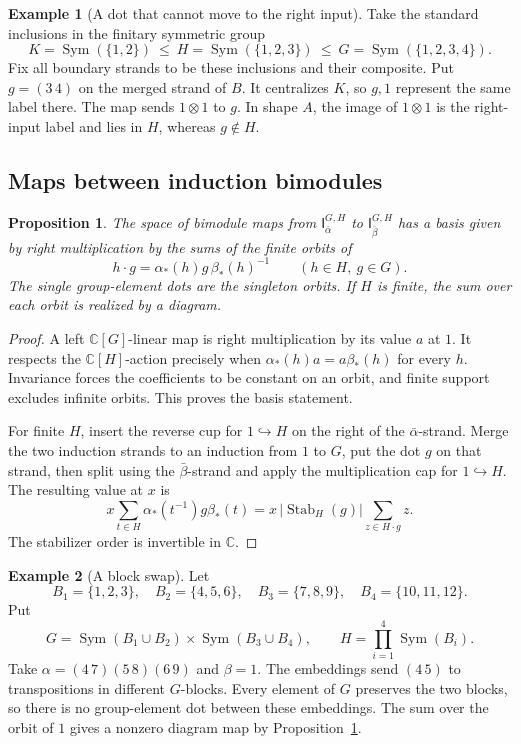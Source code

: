 \documentclass[11pt,a4paper]{article}
\numberwithin{equation}{section}
\newtheorem{proposition}[theorem]{Proposition}
\theoremstyle{definition}
\newtheorem{example}{Example}[section]
\newcommand{\C}{\mathbb C}
\newcommand{\I}{\mathsf I}
\begin{document}
\begin{example}[A dot that cannot move to the right input]\label{ex:dot-slide-obstruction}
Take the standard inclusions in the finitary symmetric group
\[
   K=\operatorname{Sym}(\{1,2\})\ \le\
   H=\operatorname{Sym}(\{1,2,3\})\ \le\
   G=\operatorname{Sym}(\{1,2,3,4\}).
\]
Fix all boundary strands to be these inclusions and their composite.
Put \(g=(3\,4)\) on the merged strand of \(B\). It centralizes
\(K\), so \(g,1\) represent the same label there. The map sends
\(1\otimes1\) to \(g\). In shape \(A\), the image of \(1\otimes1\)
is the right-input label and lies in \(H\), whereas \(g\notin H\).
\end{example}


\subsection{Maps between induction bimodules}

\begin{proposition}\label{prop:orbit-hom}
The space of bimodule maps from \(\I_{\bar\alpha}^{G,H}\) to
\(\I_{\bar\beta}^{G,H}\) has a basis given by right multiplication
by the sums of the finite orbits of
\[
       h\cdot g=\alpha_*(h)g\,\beta_*(h)^{-1}
       \qquad(h\in H,\ g\in G).
\]
The single group-element dots are the singleton orbits. If \(H\) is
finite, the sum over each orbit is realized by a diagram.
\end{proposition}
\begin{proof}
A left \(\C[G]\)-linear map is right multiplication by its value \(a\)
at \(1\). It respects the \(\C[H]\)-action precisely when
\(\alpha_*(h)a=a\beta_*(h)\) for every \(h\). Invariance forces the
coefficients to be constant on an orbit, and finite support excludes
infinite orbits. This proves the basis statement.

For finite \(H\), insert the reverse cup for \(1\hookrightarrow H\)
on the right of the \(\bar\alpha\)-strand. Merge the two induction
strands to an induction from \(1\) to \(G\), put the dot \(g\) on
that strand, then split using the \(\bar\beta\)-strand and apply the
multiplication cap for \(1\hookrightarrow H\). The resulting value
at \(x\) is
\[
 x\sum_{t\in H}\alpha_*(t^{-1})g\beta_*(t)
   =x\,|\operatorname{Stab}_H(g)|\sum_{z\in H\cdot g}z .
\]
The stabilizer order is invertible in \(\C\).
\end{proof}


\begin{example}[A block swap]\label{ex:block-swap}
Let
\[
 B_1=\{1,2,3\},\quad B_2=\{4,5,6\},\quad
 B_3=\{7,8,9\},\quad B_4=\{10,11,12\}.
\]
Put
\[
 G=\operatorname{Sym}(B_1\cup B_2)\times\operatorname{Sym}(B_3\cup B_4),
 \qquad H=\prod_{i=1}^4\operatorname{Sym}(B_i).
\]
Take \(\alpha=(4\,7)(5\,8)(6\,9)\) and \(\beta=1\).
The embeddings send \((4\,5)\) to transpositions in different
\(G\)-blocks. Every element of \(G\) preserves the two blocks,
so there is no group-element dot between these embeddings.
The sum over the orbit of \(1\) gives a nonzero diagram map by
Proposition~\ref{prop:orbit-hom}.
\end{example}
\end{document}
